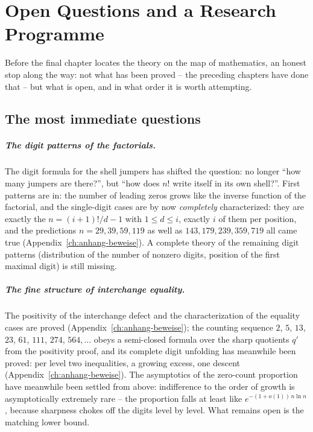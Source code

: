 \chapter{Open Questions and a Research Programme}
\label{ch:offen}


Before the final chapter locates the theory on the map of
mathematics, an honest stop along the way: not what has been
proved -- the preceding chapters have done that -- but what is
open, and in what order it is worth attempting.

\section{The most immediate questions}

\paragraph{The digit patterns of the factorials.} The digit
formula for the shell jumpers has shifted the question: no longer
``how many jumpers are there?'', but ``how does $n!$ write itself
in its own shell?''. First patterns are in: the number of leading
zeros grows like the inverse function of the factorial, and the
single-digit cases are by now \emph{completely} characterized:
they are exactly the $n=(i+1)!/d-1$ with $1\le d\le i$, exactly
$i$ of them per position, and the predictions $n=29,39,59,119$ as
well as $143,179,239,359,719$ all came true
(Appendix~\ref{ch:anhang-beweise}). A complete theory of the
remaining digit patterns (distribution of the number of nonzero
digits, position of the first maximal digit) is still missing.

\paragraph{The fine structure of interchange equality.} The
positivity of the interchange defect and the characterization of
the equality cases are proved (Appendix~\ref{ch:anhang-beweise});
the counting sequence $2$, $5$, $13$, $23$, $61$, $111$, $274$,
$564,\ldots$ obeys a semi-closed formula over the sharp quotients
$q'$ from the positivity proof, and its complete digit unfolding
has meanwhile been proved: per level two inequalities, a growing
excess, one descent (Appendix~\ref{ch:anhang-beweise}). The
asymptotics of the zero-count proportion have meanwhile been
settled from above: indifference to the order of growth is
asymptotically extremely rare -- the proportion falls at least
like $e^{-(1+o(1))\,n\ln n}$, because sharpness chokes off the
digits level by level. What remains open is the matching lower
bound.

